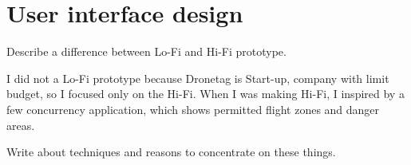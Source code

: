 \chapter{User interface design}\label{ch:user-interface-design}

Describe a difference between Lo-Fi and Hi-Fi prototype.

I did not a Lo-Fi prototype because Dronetag is Start-up, company with limit budget, so I focused only on the Hi-Fi.
When I was making Hi-Fi, I inspired by a few concurrency application, which shows permitted flight zones and danger areas.

Write about techniques and reasons to concentrate on these things.



